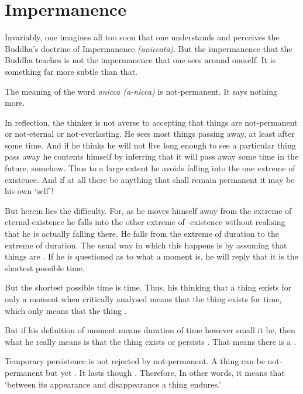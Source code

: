 \chapter{Impermanence}

Invariably, one imagines all too soon that one understands and perceives the Buddha's doctrine of Impermanence \emph{(aniccatā)}. But the impermanence that the Buddha teaches is not the impermanence that one sees around oneself. It is something far more subtle than that.

The meaning of the word \emph{anicca (a-nicca)} is not-permanent. It says nothing more.

In reflection, the thinker is not averse to accepting that things are not-permanent or not-eternal or not-everlasting. He sees most things passing away, at least after some time. And if he thinks he will not live long enough to see a particular thing pass away he contents himself by inferring that it will pass away some time in the future, somehow. Thus to a large extent he avoids falling into the one extreme of  existence. And if at all there be anything that shall remain permanent it may be his own `self'!

But herein lies the difficulty. For, as he moves himself away from the extreme of eternal-existence he falls into the other extreme of -existence without realising that he is actually falling there. He falls from the extreme of  duration to the extreme of  duration. The usual way in which this happens is by assuming that things are . If he is questioned as to what a moment is, he will reply that it is the shortest possible time.

But the shortest possible time is  time. Thus, his thinking that a thing exists for only a moment when critically analysed means that the thing exists for  time, which only means that the thing .

But if his definition of moment means  duration of time however small it be, then what he really means is that the thing exists or persists . That means there is a .

Temporary persistence is not rejected by not-permanent. A thing can be not-permanent but yet . It lasts  though . Therefore,  In other words, it means that `between its appearance and disappearance a thing endures.'

